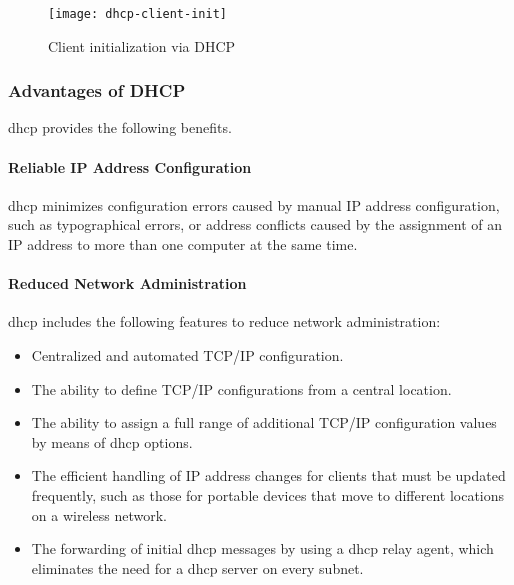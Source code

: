 
\begin{figure}[ht!]
	\centering
	\texttt{[image: dhcp-client-init]}
	\caption{Client initialization via DHCP}\label{fig:dhcp-client-init}
\end{figure}


\subsubsection*{Advantages of DHCP}
\gls{dhcp} provides the following benefits.

\paragraph*{Reliable IP Address Configuration} 
\gls{dhcp} minimizes configuration errors caused by manual IP address configuration, such as typographical errors, or address conflicts caused by the assignment of an IP address to more than one computer at the same time.

\paragraph*{Reduced Network Administration} 
\gls{dhcp} includes the following features to reduce network administration:
\begin{itemize}
	\item Centralized and automated TCP/IP configuration.
	
	\item The ability to define TCP/IP configurations from a central location.
	
	\item The ability to assign a full range of additional TCP/IP configuration values by means of \gls{dhcp} options.
		
	\item The efficient handling of IP address changes for clients that must be updated frequently, such as those for portable devices that move to different locations on a wireless network.
		
	\item The forwarding of initial \gls{dhcp} messages by using a \gls{dhcp} relay agent, which eliminates the need for a \gls{dhcp} server on every subnet.
					
\end{itemize}


